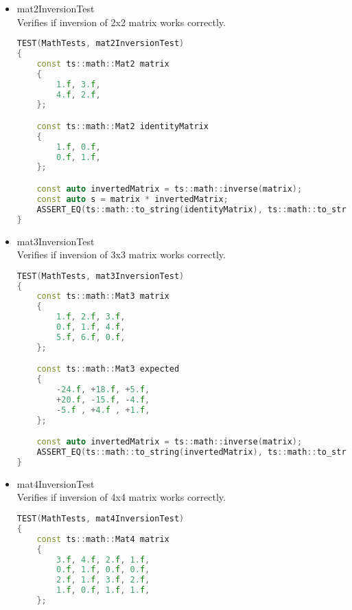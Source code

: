 \begin{itemize}
\begin{itemize}
\begin{lstlisting}[language=c++, caption=mat3MultiplicationTest test(./engine/tests/tester.cpp)]
    const ts::math::Mat3 rightMatrix
    {
        0.11f, 0.12f, 0.13f,
        0.14f, 0.15f, 0.16f,
        0.17f, 0.18f, 0.19f,
    };

    const ts::math::Mat3 expected
    {
        0.216f, 0.231f, 0.246f,
        0.342f, 0.366f, 0.39f ,
        0.09f , 0.096f, 0.102f,
    };

    const auto multiplication = rightMatrix * leftMatrix;
    ASSERT_EQ(ts::math::to_string(expected), ts::math::to_string(multiplication));
}
\end{lstlisting}
            \item mat2InversionTest\\ Verifies if inversion of 2x2 matrix works correctly.
\begin{lstlisting}[language=c++, caption=mat2InversionTest test(./engine/tests/tester.cpp)]
TEST(MathTests, mat2InversionTest)
{
    const ts::math::Mat2 matrix
    {
        1.f, 3.f,
        4.f, 2.f,
    };

    const ts::math::Mat2 identityMatrix
    {
        1.f, 0.f,
        0.f, 1.f,
    };

    const auto invertedMatrix = ts::math::inverse(matrix);
    const auto s = matrix * invertedMatrix;
    ASSERT_EQ(ts::math::to_string(identityMatrix), ts::math::to_string(s));
}
\end{lstlisting}
            \item mat3InversionTest\\ Verifies if inversion of 3x3 matrix works correctly.
\begin{lstlisting}[language=c++, caption=mat3InversionTest test(./engine/tests/tester.cpp)]
TEST(MathTests, mat3InversionTest)
{
    const ts::math::Mat3 matrix
    {
        1.f, 2.f, 3.f,
        0.f, 1.f, 4.f,
        5.f, 6.f, 0.f,
    };

    const ts::math::Mat3 expected
    {
        -24.f, +18.f, +5.f,
        +20.f, -15.f, -4.f,
        -5.f , +4.f , +1.f,
    };

    const auto invertedMatrix = ts::math::inverse(matrix);
    ASSERT_EQ(ts::math::to_string(invertedMatrix), ts::math::to_string(expected));
}
\end{lstlisting}
            \item mat4InversionTest\\ Verifies if inversion of 4x4 matrix works correctly.
\begin{lstlisting}[language=c++, caption=mat4InversionTest test(./engine/tests/tester.cpp)]
TEST(MathTests, mat4InversionTest)
{
    const ts::math::Mat4 matrix
    {
        3.f, 4.f, 2.f, 1.f,
        0.f, 1.f, 0.f, 0.f,
        2.f, 1.f, 3.f, 2.f,
        1.f, 0.f, 1.f, 1.f,
    };


\end{lstlisting}
\end{itemize}
\end{itemize}
